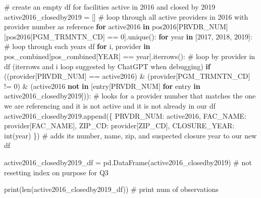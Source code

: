 \documentclass[
  letterpaper,
  DIV=11,
  numbers=noendperiod]{scrartcl}
\newenvironment{Shaded}{\begin{snugshade}}{\end{snugshade}}
\newcommand{\BuiltInTok}[1]{\textcolor[rgb]{0.00,0.23,0.31}{#1}}
\newcommand{\CommentTok}[1]{\textcolor[rgb]{0.37,0.37,0.37}{#1}}
\newcommand{\ControlFlowTok}[1]{\textcolor[rgb]{0.00,0.23,0.31}{\textbf{#1}}}
\newcommand{\DecValTok}[1]{\textcolor[rgb]{0.68,0.00,0.00}{#1}}
\newcommand{\KeywordTok}[1]{\textcolor[rgb]{0.00,0.23,0.31}{\textbf{#1}}}
\newcommand{\NormalTok}[1]{\textcolor[rgb]{0.00,0.23,0.31}{#1}}
\newcommand{\OperatorTok}[1]{\textcolor[rgb]{0.37,0.37,0.37}{#1}}
\newcommand{\StringTok}[1]{\textcolor[rgb]{0.13,0.47,0.30}{#1}}
\begin{document}
\begin{Shaded}
\begin{Highlighting}[]
\CommentTok{\# create an empty df for facilities active in 2016 and closed by 2019}
\NormalTok{active2016\_closedby2019 }\OperatorTok{=}\NormalTok{ []}
\CommentTok{\# loop through all active providers in 2016 with provider number as reference}
\ControlFlowTok{for}\NormalTok{ active2016 }\KeywordTok{in}\NormalTok{ pos2016[}\StringTok{\textquotesingle{}PRVDR\_NUM\textquotesingle{}}\NormalTok{][pos2016[}\StringTok{\textquotesingle{}PGM\_TRMNTN\_CD\textquotesingle{}}\NormalTok{] }\OperatorTok{==} \DecValTok{0}\NormalTok{].unique():}
    \ControlFlowTok{for}\NormalTok{ year }\KeywordTok{in}\NormalTok{ [}\DecValTok{2017}\NormalTok{, }\DecValTok{2018}\NormalTok{, }\DecValTok{2019}\NormalTok{]:  }\CommentTok{\# loop through each year\textquotesingle{}s df}
        \ControlFlowTok{for}\NormalTok{ i, provider }\KeywordTok{in}\NormalTok{ pos\_combined[pos\_combined[}\StringTok{\textquotesingle{}YEAR\textquotesingle{}}\NormalTok{] }\OperatorTok{==}\NormalTok{ year].iterrows(): }\CommentTok{\# loop by provider in df (iterrows and i loop suggested by ChatGPT when debugging)}
            \ControlFlowTok{if}\NormalTok{ ((provider[}\StringTok{\textquotesingle{}PRVDR\_NUM\textquotesingle{}}\NormalTok{] }\OperatorTok{==}\NormalTok{ active2016) }\OperatorTok{\&}\NormalTok{ (provider[}\StringTok{\textquotesingle{}PGM\_TRMNTN\_CD\textquotesingle{}}\NormalTok{] }\OperatorTok{!=} \DecValTok{0}\NormalTok{) }\OperatorTok{\&}\NormalTok{ (active2016 }\KeywordTok{not} \KeywordTok{in}\NormalTok{ [entry[}\StringTok{\textquotesingle{}PRVDR\_NUM\textquotesingle{}}\NormalTok{] }\ControlFlowTok{for}\NormalTok{ entry }\KeywordTok{in}\NormalTok{ active2016\_closedby2019])):  }\CommentTok{\# looks for a provider number that matches the one we are referencing and it is not active and it is not already in our df}
\NormalTok{                active2016\_closedby2019.append(\{}
                    \StringTok{\textquotesingle{}PRVDR\_NUM\textquotesingle{}}\NormalTok{: active2016,}
                    \StringTok{\textquotesingle{}FAC\_NAME\textquotesingle{}}\NormalTok{: provider[}\StringTok{\textquotesingle{}FAC\_NAME\textquotesingle{}}\NormalTok{],}
                    \StringTok{\textquotesingle{}ZIP\_CD\textquotesingle{}}\NormalTok{: provider[}\StringTok{\textquotesingle{}ZIP\_CD\textquotesingle{}}\NormalTok{],}
                    \StringTok{\textquotesingle{}CLOSURE\_YEAR\textquotesingle{}}\NormalTok{: }\BuiltInTok{int}\NormalTok{(year)}
\NormalTok{                \})  }\CommentTok{\# adds its number, name, zip, and suspected closure year to our new df}
                
\NormalTok{active2016\_closedby2019\_df }\OperatorTok{=}\NormalTok{ pd.DataFrame(active2016\_closedby2019) }\CommentTok{\# not resetting index on purpose for Q3}

\BuiltInTok{print}\NormalTok{(}\BuiltInTok{len}\NormalTok{(active2016\_closedby2019\_df)) }\CommentTok{\# print num of observations}
\end{Highlighting}
\end{Shaded}
\end{document}
